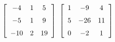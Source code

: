 {$\left[ \begin {array}{ccc} -4&1&5\\\noalign{\medskip}-5&1&9
\\\noalign{\medskip}-10&2&19\end {array} \right]$ 
}
{$\left[ \begin {array}{ccc} 1&-9&4\\\noalign{\medskip}5&-26&11
\\\noalign{\medskip}0&-2&1\end {array} \right]$}
